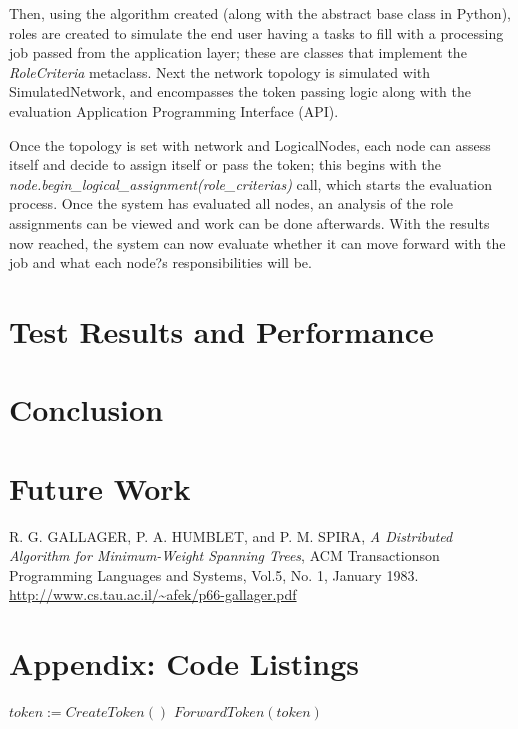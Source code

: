 \documentclass[11pt]{article}
\begin{document}
\begin{multicols}{2}
Then, using the algorithm created (along with the abstract base class in Python), roles are created to simulate the end user having a tasks to fill with a processing job passed from the application layer; these are classes that implement the \textit{RoleCriteria} metaclass.  Next the network topology is simulated with SimulatedNetwork, and encompasses the token passing logic along with the evaluation Application Programming Interface (API).  

Once the topology is set with network and LogicalNodes, each node can assess itself and decide to assign itself or pass the token; this begins with the \textit{node.begin\_logical\_assignment(role\_criterias)} call, which starts the evaluation process.  Once the system has evaluated all nodes, an analysis of the role assignments can be viewed and work can be done afterwards.  With the results now reached, the system can now evaluate whether it can move forward with the job and what each node?s responsibilities will be.  

\section{Test Results and Performance}

\section{Conclusion}

\section{Future Work}
\end{multicols}
\begin{thebibliography}{9}
  
  R. G. GALLAGER, P. A. HUMBLET, and P. M. SPIRA,
  \emph{A Distributed Algorithm for Minimum-Weight Spanning Trees},
  ACM Transactionson Programming Languages and Systems, Vol.5, No. 1, January 1983.
  \url{http://www.cs.tau.ac.il/~afek/p66-gallager.pdf}

\end{thebibliography}

\section{Appendix: Code Listings}
\appendix

\begin{algorithmic}
	\State $token := CreateToken()$
	\State $ForwardToken(token)  $
\EndFunction
\end{algorithmic}	
\end{document}
